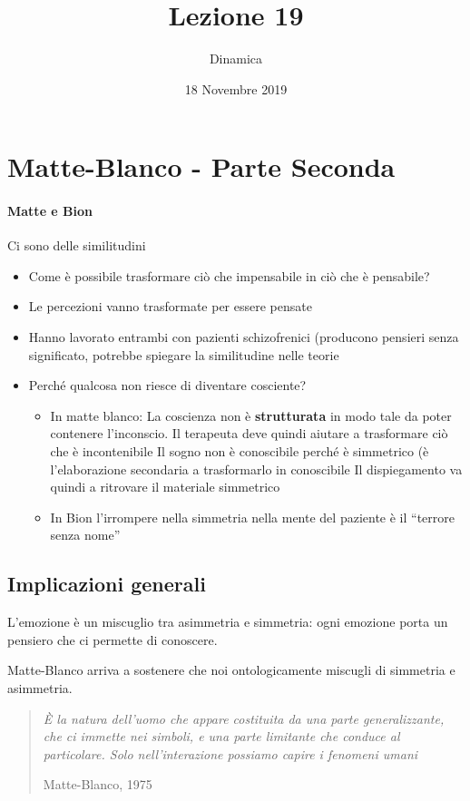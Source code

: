 \documentclass[12pt, a4paper]{article}
\date{18 Novembre 2019}
\title{Lezione 19}
\author{Dinamica}
\begin{document}
\maketitle

\section{Matte-Blanco - Parte Seconda}

\paragraph{Matte e Bion}  Ci sono delle similitudini
\begin{itemize}
    \item Come è possibile trasformare ciò che impensabile in ciò che è pensabile?
    \item Le percezioni vanno trasformate per essere pensate
    \item Hanno lavorato entrambi con pazienti schizofrenici (producono pensieri senza significato, potrebbe spiegare la similitudine nelle teorie
    \item Perché qualcosa non riesce di diventare cosciente?
        \begin{itemize}
            \item In matte blanco: La coscienza non è \textbf{strutturata} in modo tale da poter contenere l'inconscio. Il terapeuta deve quindi aiutare a trasformare ciò che è incontenibile
            Il sogno non è conoscibile perché è simmetrico (è l'elaborazione secondaria a trasformarlo in conoscibile
            Il dispiegamento va quindi a ritrovare il materiale simmetrico
            \item  In Bion l'irrompere nella simmetria nella mente del paziente è il ``terrore senza nome''
        \end{itemize}

\end{itemize}

\subsection{Implicazioni generali} 

L'emozione è un miscuglio tra asimmetria e simmetria: ogni emozione porta un pensiero che ci permette di conoscere.

Matte-Blanco arriva a sostenere che noi ontologicamente miscugli di simmetria e asimmetria.

\bigskip
\begin{quote}
    \emph{È la natura dell'uomo che appare costituita da una parte generalizzante, che ci immette nei simboli, e una parte limitante che conduce al particolare. Solo nell'interazione possiamo capire i fenomeni umani}
    \begin{flushright}
        Matte-Blanco, 1975
    \end{flushright}
\end{quote}
\end{document}
